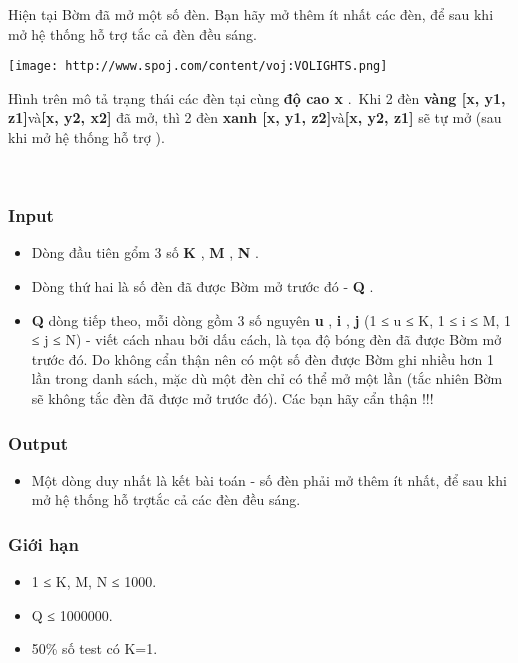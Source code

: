 Hiện tại Bờm đã mở một số đèn. Bạn hãy mở thêm ít nhất các đèn, để sau khi mở hệ thống hỗ trợ tắc cả đèn đều sáng.


\texttt{[image: http://www.spoj.com/content/voj:VOLIGHTS.png]}

Hình trên mô tả trạng thái các đèn tại cùng \textbf{độ cao x} . Khi 2 đèn \textbf{vàng [x, y1, z1]}và\textbf{[x, y2, x2]} đã mở, thì 2 đèn \textbf{xanh [x, y1, z2]}và\textbf{[x, y2, z1]} sẽ tự mở (sau khi mở hệ thống hỗ trợ ).

 

\subsubsection{Input}
\begin{itemize}
	\item Dòng đầu tiên gổm 3 số \textbf{ K } , \textbf{ M } , \textbf{ N } .
	\item Dòng thứ hai là số đèn đã được Bờm mở trước đó - \textbf{ Q } .
	\item \textbf{Q } dòng tiếp theo, mỗi dòng gồm 3 số nguyên \textbf{ u } , \textbf{ i } , \textbf{ j }(1 ≤ u ≤ K, 1 ≤ i ≤ M, 1 ≤ j ≤ N) - viết cách nhau bởi dấu cách, là tọa độ bóng đèn đã được Bờm mở trước đó. Do không cẩn thận nên có một số đèn được Bờm ghi nhiều hơn 1 lần trong danh sách, mặc dù một đèn chỉ có thể mở một lần (tắc nhiên Bờm sẽ không tắc đèn đã được mở trước đó). Các bạn hãy cẩn thận !!!
\end{itemize}

\subsubsection{Output}
\begin{itemize}
	\item Một dòng duy nhất là kết bài toán - số đèn phải mở thêm ít nhất, để sau khi mở hệ thống hỗ trợtắc cả các đèn đều sáng.
\end{itemize}

\subsubsection{Giới hạn}
\begin{itemize}
	\item 1 ≤ K, M, N ≤ 1000.
	\item Q ≤ 1000000.
	\item 50\% số test có K=1.
\end{itemize}

